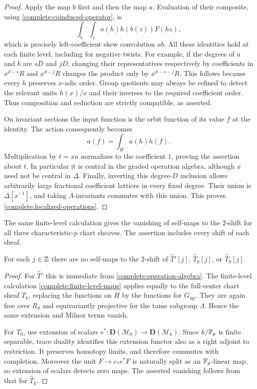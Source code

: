 \begin{proof}
Apply the map $b$ first and then the map $a$. Evaluation of their
composite, using \eqref{complete:coinduced-operator}, is
\[
 \int_h\int_z a(h)h(b(z))F(hz),
\]
which is precisely left-coefficient skew convolution $ab$. All these
identities hold at each finite level, including for negative twists.
For example, if the degrees of $a$ and $b$ are $sD$ and $jD$,
changing their representatives respectively by coefficients in
$x^{d-s}R$ and $x^{d-j}R$ changes the product only by
$x^{d-s-j}R$. This follows because every $h$ preserves $x$-adic
order. Group quotients may always be refined to detect the relevant
units $h(x)/x$ and their inverses to the required coefficient order.
Thus composition and reduction are strictly compatible, as asserted.

On invariant sections the input function is the orbit function of
its value $f$ at the identity. The action consequently becomes
\begin{equation}
\label{complete:action-on-sections}
 a(f)=\int_H a(h)h(f).
\end{equation}
Multiplication by $t=xu$ normalizes to the coefficient $1$, proving
the assertion about $t$. In particular it is central in the graded
operation algebra, although $x$ need not be central in $\Delta$.
Finally, inverting this degree-$D$ inclusion allows arbitrarily large
fractional coefficient lattices in every fixed degree. Their union
is $\Delta[x^{-1}]$, and taking $\Lambda$-invariants commutes with
this union. This proves \eqref{complete:localized-operations}.
\end{proof}

The same finite-level calculation gives the vanishing of self-maps to
the $2$-shift for all three characteristic-$p$ chart sheaves. The
assertion includes every shift of each sheaf.

\begin{corollary}
\label{complete:degree-two}
For each $j\in\mathbb Z$ there are no self-maps to the $2$-shift of
$\widehat T'[j]$, $\widehat T_k[j]$, or $\widehat T_0[j]$.
\end{corollary}

\begin{proof}
For $\widehat T'$ this is immediate from
\eqref{complete:operation-algebra}. The finite-level calculation
\eqref{complete:finite-level-maps} applies equally to the full-center
chart sheaf $T_k$, replacing the functions on $H$ by the functions
for $G_{\mathrm{up}}$. They are again free over $R_d$ and
equivariantly projective for the tame subgroup $\Lambda$. Hence
the same extension and Milnor terms vanish.

For $T_0$, use extension of scalars
$e^*:\mathbf D(\mathcal M_0)\to\mathbf D(\mathcal M_k)$.
Since $k/\mathbb F_p$ is finite separable, trace duality identifies this
extension functor also as a right adjoint to restriction. It
preserves homotopy limits, and therefore commutes with completion.
Moreover the unit $F\to e_*e^*F$ is naturally split as an
$\mathbb F_p$-linear map, so extension of scalars detects zero maps.
The asserted vanishing follows from that for $\widehat T_k$.
\end{proof}

